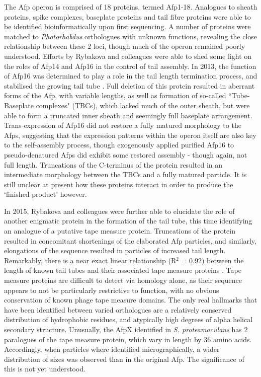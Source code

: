 The Afp operon is comprised of 18 proteins, termed Afp1-18. Analogues to sheath proteins, spike complexes, baseplate proteins and tail fibre proteins were able to be identified bioinformatically upon first sequencing. A number of proteins were matched to \emph{Photorhabdus} orthologues with unknown functions, revealing the close relationship between these 2 loci, though much of the operon remained poorly understood. Efforts by Rybakova and colleagues were able to shed some light on the roles of Afp14 and Afp16 in the control of tail assembly. In 2013, the function of Afp16 was determined to play a role in the tail length termination process, and stabilised the growing tail tube \citep{Rybakova2013}. Full deletion of this protein resulted in aberrant forms of the Afp, with variable lengths, as well as formation of so-called ``Tube-Baseplate complexes" (TBCs), which lacked much of the outer sheath, but were able to form a truncated inner sheath and seemingly full baseplate arrangement. Trans-expression of Afp16 did not restore a fully matured morphology to the Afps, suggesting that the expression patterns within the operon itself are also key to the self-assembly process, though exogenously applied purified Afp16 to pseudo-denatured Afps did exhibit some restored assembly - though again, not full length. Truncations of the C-terminus of the protein resulted in an intermediate morphology between the TBCs and a fully matured particle. It is still unclear at present how these proteins interact in order to produce the `finished product' however.

In 2015, Rybakova and colleagues were further able to elucidate the role of another enigmatic protein in the formation of the tail tube, this time identifying an analogue of a putative tape measure protein. Truncations of the protein resulted in concomitant shortenings of the elaborated Afp particles, and similarly, elongations of the sequence resulted in particles of increased tail length. Remarkably, there is a near exact linear relationship (R$^2$ = 0.92) between the length of known tail tubes and their associated tape measure proteins \citep{Rybakova2015, Pedulla2003}. Tape measure proteins are difficult to detect via homology alone, as their sequence appears to not be particularly restrictive to function, with no obvious conservation of known phage tape measure domains. The only real hallmarks that have been identified between varied orthologues are a relatively conserved distribution of hydrophobic residues, and atypically high degrees of alpha helical secondary structure. Unusually, the AfpX identified in \emph{S. proteamaculans} has 2 paralogues of the tape measure protein, which vary in length by 36 amino acids. Accordingly, when particles where identified micrographically, a wider distribution of sizes was observed than in the original Afp. The significance of this is not yet understood.

